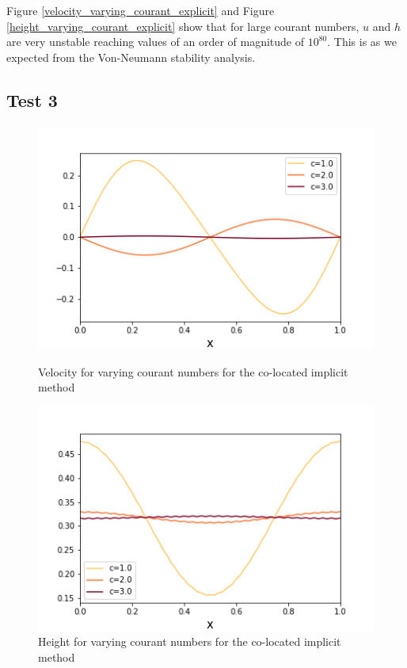 \documentclass[a4paper,12pt, notitlepage]{article}
\begin{document}
Figure \ref{velocity_varying_courant_explicit} and Figure \ref{height_varying_courant_explicit} show that for large courant numbers, $u$ and $h$ are very unstable reaching values of an order of magnitude of $10^{80}$. This is as we expected from the Von-Neumann stability analysis.

\subsection{Test 3}

\begin{figure} [H]
	\begin{minipage}{.5\textwidth}
		\ContinuedFloat*
		\captionsetup{width=0.9\textwidth}
		\captionsetup{justification=centering}
		\includegraphics[width=\textwidth]{velocity_varying_courant_implicit.png}
		\caption{\label{velocity_varying_courant_implicit} Velocity for varying courant numbers for the co-located implicit method} 
	\end{minipage}
	\begin{minipage}{.5\textwidth}
		\ContinuedFloat
		\captionsetup{width=0.9\textwidth}
		\captionsetup{justification=centering}
		\includegraphics[width=\textwidth]{height_varying_courant_implicit.png}
		\caption{\label{height_varying_courant_implicit} Height for varying courant numbers for the co-located implicit method} 
	\end{minipage}
\end{figure}
\end{document}
